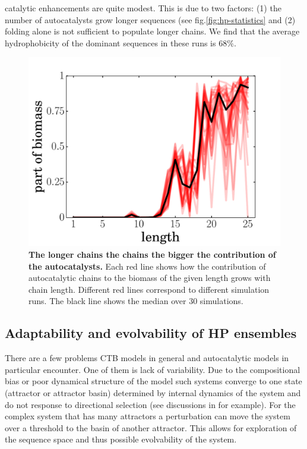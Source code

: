 \documentclass[5p,times]{elsarticle}
\begin{document}
catalytic enhancements are quite modest.  This is due to two factors: (1) the number of 
autocatalysts grow longer sequences (see fig.\ref{fig:hp-statistics} and (2) folding alone is not 
sufficient to populate longer chains.  We find that the average hydrophobicity of the dominant 
sequences in these runs is $68\%$.
 \begin{figure}[h!]
  \centering
  \includegraphics[width=0.9\columnwidth]{pictures/biomass.pdf} 
  \caption{\footnotesize{\textbf{The longer chains the chains the bigger the contribution of the 
autocatalysts.} Each red line shows how the contribution of autocatalytic chains to the biomass 
of the given length grows with chain length. Different red lines correspond to different 
simulation runs.  The black line shows the median over 30 simulations.
}}
  \label{fig:biomass}
\end{figure}

\subsection{Adaptability and evolvability of HP ensembles}
There are a few problems CTB models in general and autocatalytic models in particular encounter. 
One of them is lack of variability. Due to the compositional bias or poor dynamical structure of 
the model such systems converge to one state (attractor or attractor basin) determined by 
internal dynamics of the system and do not response to directional 
selection (see discussions in \cite{Derr2012,Vasas2015} for example). For the complex system that 
has many attractors a  perturbation can move the system over a threshold to the basin of another 
attractor. This allows for exploration of the sequence space and thus possible evolvability of the 
system. 
\end{document}
